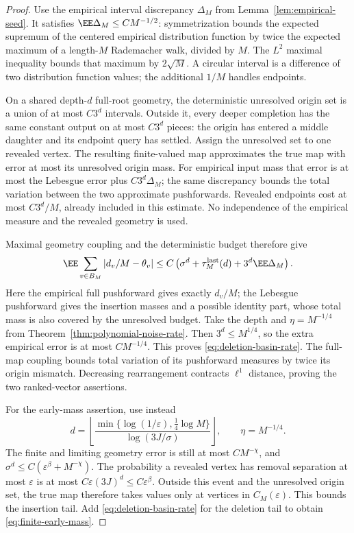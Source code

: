 \documentclass[11pt,letterpaper]{article}
\begin{document}
\begin{proof}
Use the empirical interval discrepancy $\Delta_M$ from
Lemma~\ref{lem:empirical-seed}. It satisfies
$\EE\Delta_M\le C M^{-1/2}$: symmetrization bounds the expected
supremum of the centered empirical distribution function by twice
the expected maximum of a length-$M$ Rademacher walk, divided by
$M$. The $L^2$ maximal inequality bounds that maximum by
$2\sqrt M$. A circular interval is a difference of two distribution
function values; the additional $1/M$ handles endpoints.

On a shared depth-$d$ full-root geometry, the deterministic unresolved
origin set is a union of at most $C3^d$ intervals. Outside it, every
deeper completion has the same constant output on at most $C3^d$
pieces: the origin has entered a middle daughter and its endpoint
query has settled. Assign the unresolved set to one revealed vertex.
The resulting finite-valued map approximates the true map with error
at most its unresolved origin mass. For empirical input mass that
error is at most the Lebesgue error plus $C3^d\Delta_M$;
the same discrepancy bounds the total variation between the two
approximate pushforwards. Revealed endpoints cost at most
$C3^d/M$, already included in this estimate. No independence of
the empirical measure and the revealed geometry is used.

Maximal geometry coupling and the deterministic budget therefore give
\[
 \EE\sum_{v\in B_M}|d_v/M-\theta_v|
 \le C\left(\sigma^d+\tau_M^{\rm last}(d)
                         +3^d\EE\Delta_M\right).
\]
Here the empirical full pushforward gives exactly $d_v/M$; the
Lebesgue pushforward gives the insertion masses and a possible
identity part, whose total mass is also covered by the unresolved
budget. Take the depth and $\eta=M^{-1/4}$ from
Theorem~\ref{thm:polynomial-noise-rate}. Then $3^d\le M^{1/4}$,
so the extra empirical error is at most $CM^{-1/4}$.
This proves \eqref{eq:deletion-basin-rate}. The full-map coupling
bounds total variation of its pushforward measures by twice its
origin mismatch. Decreasing rearrangement contracts $\ell^1$
distance, proving the two ranked-vector assertions.

For the early-mass assertion, use instead
\[
 d=\left\lfloor
 \frac{\min\{\log(1/\varepsilon),\tfrac14\log M\}}
      {\log(3J/\sigma)}\right\rfloor,
 \qquad \eta=M^{-1/4}.
\]
The finite and limiting geometry error is still at most
$CM^{-\chi}$, and
$\sigma^d\le C(\varepsilon^\beta+M^{-\chi})$.
The probability a revealed vertex has removal separation at most
$\varepsilon$ is at most $C\varepsilon(3J)^d\le C\varepsilon^\beta$.
Outside this event and the unresolved origin set, the true map
therefore takes values only at vertices in $C_M(\varepsilon)$.
This bounds the insertion tail. Add
\eqref{eq:deletion-basin-rate} for the deletion tail to obtain
\eqref{eq:finite-early-mass}.
\end{proof}
\end{document}
